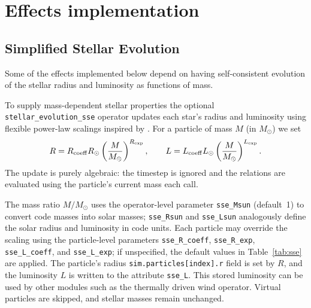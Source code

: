 \documentclass[11pt]{article}
\begin{document}
\section{Effects implementation}


\subsection{Simplified Stellar Evolution}
\label{sec:sse}
Some of the effects implemented below depend on having self-consistent evolution of the stellar radius and luminosity as functions of mass.

To supply mass-dependent stellar properties the optional
\texttt{stellar\_evolution\_sse} operator updates each star's radius and
luminosity using flexible power-law scalings inspired by \citet{Hurley2000}. For a
particle of mass $M$ (in $M_\odot$) we set
\[
R = R_{\rm coeff} R_\odot \left(\frac{M}{M_\odot}\right)^{R_{\rm exp}},\qquad
L = L_{\rm coeff} L_\odot \left(\frac{M}{M_\odot}\right)^{L_{\rm exp}}.
\]
The update is purely algebraic: the timestep is ignored and the relations are evaluated using the particle's current mass each call.

The mass ratio $M/M_\odot$ uses the operator-level parameter
\texttt{sse\_Msun} (default 1) to convert code masses into solar masses;
\texttt{sse\_Rsun} and \texttt{sse\_Lsun} analogously define the solar radius
and luminosity in code units.  Each particle may override the scaling using the
particle-level parameters \texttt{sse\_R\_coeff}, \texttt{sse\_R\_exp},
\texttt{sse\_L\_coeff}, and \texttt{sse\_L\_exp}; if unspecified, the default
values in Table~\ref{tab:sse} are applied.  The particle's radius \texttt{sim.particles[index].r} field is set by $R$, and the luminosity $L$ is written to the attribute
\texttt{sse\_L}. This stored luminosity can be used by other modules such as
the thermally driven wind operator. Virtual particles are skipped, and stellar
masses remain unchanged.
\end{document}
